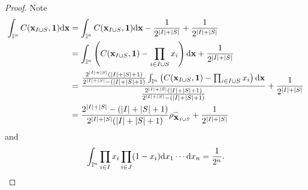 \documentclass[11pt,a4paper]{article}
\def\XX{{\mathbf X}}
\def\xx{{\mathbf x}}
\begin{document}
\begin{proof}
    Note %
\begin{align*}
\int_{\mathbb{I}^n} C(\mathbf{x}_{I \cup S},{\bf 1}) {\rm d}\mathbf{x} &= \int_{\mathbb{I}^n} C(\mathbf{x}_{I \cup S},{\bf 1}) {\rm d}\mathbf{x} - \frac{1}{2^{|I|+|S|}} + \frac{1}{2^{|I|+|S|}} \\
&= \int_{\mathbb{I}^n} \left(C(\mathbf{x}_{I \cup S},{\bf 1}) - \prod_{i \in I \cup S} x_i \right) {\rm d}\mathbf{x} + \frac{1}{2^{|I|+|S|}} \\
&= \frac{\frac{2^{|I|+|S|}(|I|+|S|+1)}{2^{|I|+|S|}-(|I|+|S|+1)} \int_{\mathbb{I}^n} \left(C(\mathbf{x}_{I \cup S},{\bf 1}) - \prod_{i \in I \cup S} x_i \right) {\rm d}\mathbf{x}}{\frac{2^{|I|+|S|}(|I|+|S|+1)}{2^{|I|+|S|}-(|I|+|S|+1)}} + \frac{1}{2^{|I|+|S|}} \\
&= \frac{2^{|I|+|S|}-(|I|+|S|+1)}{2^{|I|+|S|}(|I|+|S|+1)} \rho_{\mathbf{X}_{I \cup S}}^- + \frac{1}{2^{|I|+|S|}}
\end{align*}
and    
$$\int_{\mathbb{I}^n}\prod_{i\in I}x_i\prod_{i\in J}(1-x_i){\rm d}x_1\cdots {\rm d}x_n=\frac{1}{2^n}.$$

\end{proof}
\end{document}

